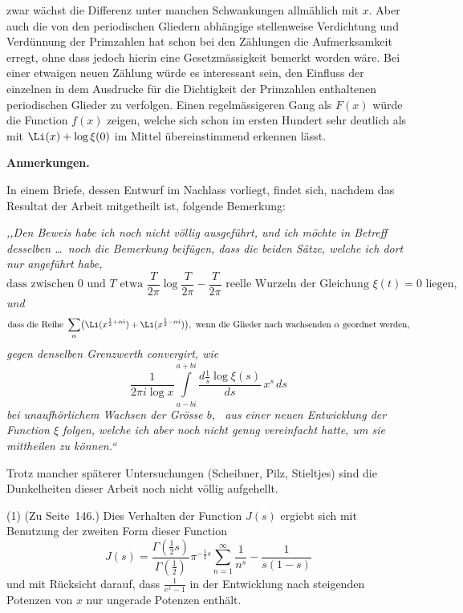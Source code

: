 \documentclass[12pt,a4paper]{book}
\theoremstyle{definition}
\theoremstyle{remark}
\begin{document}
zwar w\"achst die Differenz unter manchen Schwankungen allm\"ahlich mit $x$. Aber auch die von den periodischen Gliedern abh\"angige stellenweise Verdichtung und Verd\"unnung der Primzahlen hat schon bei den Z\"ahlungen die Aufmerksamkeit erregt, ohne dass jedoch hierin eine Gesetzm\"assigkeit bemerkt worden w\"are. Bei einer etwaigen neuen Z\"ahlung w\"urde es interessant sein, den Einfluss der einzelnen in dem Ausdrucke f\"ur die Dichtigkeit der Primzahlen enthaltenen periodischen Glieder zu verfolgen. Einen regelm\"assigeren Gang als $F(x)$ w\"urde die Function $f(x)$ zeigen, welche sich schon im ersten Hundert sehr deutlich als mit $\Li(x) + \log\xi(0)$ im Mittel \"ubereinstimmend erkennen l\"asst.

\bigskip
\noindent\textbf{Anmerkungen.}

\smallskip
\noindent In einem Briefe, dessen Entwurf im Nachlass vorliegt, findet sich, nachdem das Resultat der Arbeit mitgetheilt ist, folgende Bemerkung:

\smallskip
\noindent\textit{,,Den Beweis habe ich noch nicht v\"ollig ausgef\"uhrt, und ich m\"ochte in Betreff desselben \dots\ noch die Bemerkung beif\"ugen, dass die beiden S\"atze, welche ich dort nur angef\"uhrt habe,
\[
\text{dass zwischen }0\text{ und }T\text{ etwa }\frac{T}{2\pi}\log\frac{T}{2\pi}-\frac{T}{2\pi}\text{ reelle Wurzeln der Gleichung }\xi(t) = 0\text{ liegen,}
\]
und
\[
\text{dass die Reihe }\sum_{\alpha}\bigl(\Li(x^{\frac{1}{2}+\alpha i}) + \Li(x^{\frac{1}{2}-\alpha i})\bigr),\text{ wenn die Glieder nach wachsenden }\alpha\text{ geordnet werden,}
\]
gegen denselben Grenzwerth convergirt, wie
\[
\frac{1}{2\pi i\log x}\int\limits_{a-bi}^{a+bi}\frac{d\frac{1}{s}\log\xi(s)}{ds}\,x^{s}\,ds
\]
bei unaufh\"orlichem Wachsen der Gr\"osse $b$,
\ aus einer neuen Entwicklung der Function $\xi$ folgen, welche ich aber noch nicht genug vereinfacht hatte, um sie mittheilen zu k\"onnen.``}

\smallskip
\noindent Trotz mancher sp\"aterer Untersuchungen (Scheibner, Pilz, Stieltjes) sind die Dunkelheiten dieser Arbeit noch nicht v\"ollig aufgehellt.

\smallskip
\noindent (1) (Zu Seite~146.) Dies Verhalten der Function $J(s)$ ergiebt sich mit Benutzung der zweiten Form dieser Function
\[
J(s) = \frac{\Gamma(\tfrac{1}{2}s)}{\Gamma(\tfrac{1}{2})}\pi^{-\frac{1}{2}s}\sum_{n=1}^{\infty}\frac{1}{n^{s}} - \frac{1}{s(1-s)}
\]
und mit R\"ucksicht darauf, dass $\frac{1}{e^{x}-1}$ in der Entwicklung nach steigenden Potenzen von $x$ nur ungerade Potenzen enth\"alt.
\end{document}
